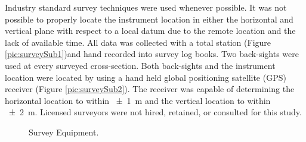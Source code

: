 Industry standard survey techniques were used whenever possible.  It was not possible to properly locate the instrument location in either the horizontal and vertical plane with respect to a local datum due to the remote location and the lack of available time.  All data was collected with a total station (Figure \ref{pic:surveySub1})and hand recorded into survey log books.  Two back-sights were used at every surveyed cross-section.  Both back-sights and the instrument location were located by using a hand held global positioning satellite (GPS) receiver (Figure \ref{pic:surveySub2}).  The receiver was capable of determining the horizontal location to within \SI{\pm 1}{\meter} and the vertical location to within \SI{\pm 2}{\meter}.  Licensed surveyors were not hired, retained, or consulted for this study.

\begin{figure}[htbp]
	\hspace{4em}%
	\caption[Survey Equipment.]{Survey Equipment.}
	\label{pic:surveyEquip}
\end{figure}

